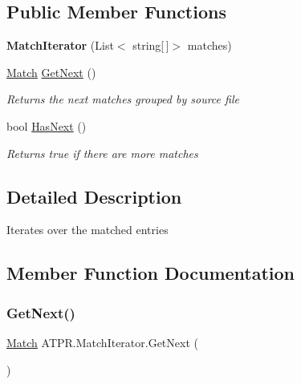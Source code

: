 \subsection*{Public Member Functions}
\begin{DoxyCompactItemize}
\item 
\hypertarget{class_a_t_p_r_1_1_match_iterator_a6baba4b1475c60b1b89609d517c4ba1b}{}\label{class_a_t_p_r_1_1_match_iterator_a6baba4b1475c60b1b89609d517c4ba1b} 
{\bfseries Match\+Iterator} (List$<$ string\mbox{[}$\,$\mbox{]}$>$ matches)
\item 
\hyperlink{class_a_t_p_r_1_1_match}{Match} \hyperlink{class_a_t_p_r_1_1_match_iterator_a72658237a15b16825e73b72d3d8ed4e2}{Get\+Next} ()
\begin{DoxyCompactList}\small\item\em Returns the next matches grouped by source file \end{DoxyCompactList}\item 
bool \hyperlink{class_a_t_p_r_1_1_match_iterator_a65b39ac2d89a16934d81a8992767d3e9}{Has\+Next} ()
\begin{DoxyCompactList}\small\item\em Returns true if there are more matches \end{DoxyCompactList}\end{DoxyCompactItemize}


\subsection{Detailed Description}
Iterates over the matched entries 



\subsection{Member Function Documentation}
\hypertarget{class_a_t_p_r_1_1_match_iterator_a72658237a15b16825e73b72d3d8ed4e2}{}\label{class_a_t_p_r_1_1_match_iterator_a72658237a15b16825e73b72d3d8ed4e2} 
\subsubsection{\texorpdfstring{Get\+Next()}{GetNext()}}
{\footnotesize\ttfamily \hyperlink{class_a_t_p_r_1_1_match}{Match} A\+T\+P\+R.\+Match\+Iterator.\+Get\+Next (\begin{DoxyParamCaption}{ }\end{DoxyParamCaption})\hspace{0.3cm}{\ttfamily [inline]}}




